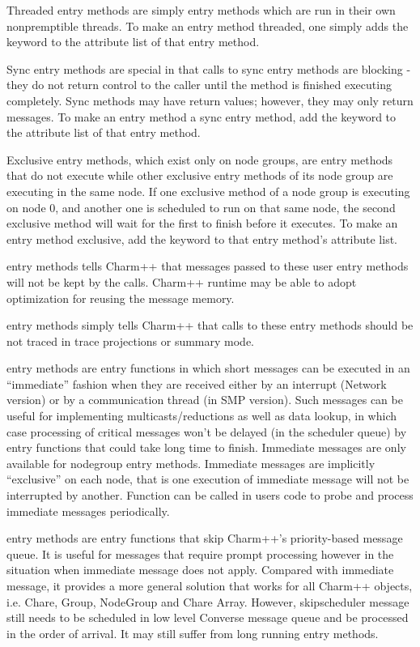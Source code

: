 Threaded entry methods are simply entry
methods which are run in their own nonpremptible threads.  To make an
entry method threaded, one simply adds the keyword
 to the attribute list of that entry method.

Sync entry methods are special in that calls to
sync entry methods are blocking - they do not return control to the caller
until the method is finished executing completely.  Sync methods may have
return values; however, they may only return messages.  To make an entry method a sync entry method, add the keyword  to the
attribute list of that entry method.

Exclusive entry methods, which exist only on node groups, are
entry methods that do not execute while other exclusive
entry methods of its node group are executing in the same
node.  If one exclusive method of a node group is executing on node 0, and
another one is scheduled to run on that same node, the second exclusive method
will wait for the first to finish before it executes.  To make an entry method exclusive, add the keyword  to that
entry method's attribute list.

 entry methods tells Charm++ that messages passed to
these user entry methods will not be kept by the calls. Charm++ runtime
may be able to adopt optimization for reusing the message memory.

 entry methods simply tells Charm++ that calls to 
these entry methods should be not traced in trace projections or summary mode.

 entry methods are entry functions in which 
short messages can be executed in an ``immediate'' fashion when they are 
received either by an interrupt (Network version) or by a communication 
thread (in SMP version). Such messages can be useful for 
implementing multicasts/reductions as well as data lookup, in which case 
processing of critical messages won't be delayed (in the scheduler queue) 
by entry functions that could take long time to finish. 
Immediate messages are only available for nodegroup entry methods.
Immediate messages are implicitly ``exclusive'' on each node, that is 
one execution of immediate message will not be interrupted by another.
Function  can be called in users code to 
probe and process immediate messages periodically.

 entry methods are entry functions 
that skip Charm++'s priority-based message queue. It is useful for messages 
that require prompt processing however in the situation when immediate message 
does not apply. Compared with immediate message, it provides a more general
solution that works for all Charm++ objects, i.e. Chare, Group, NodeGroup 
and Chare Array. However, skipscheduler message still needs to be 
scheduled in low level Converse message queue and be processed in the order 
of arrival. It may still suffer from long running entry methods.




